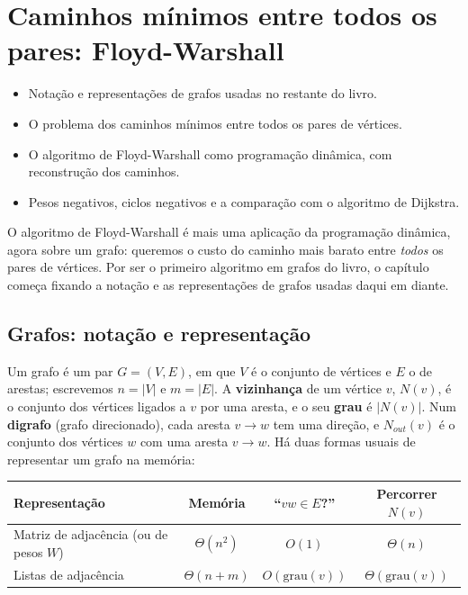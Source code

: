 \chapter{Caminhos mínimos entre todos os pares: Floyd-Warshall}\label{cap:fw}\label{sec:fw}
\begin{objetivos}
\begin{itemize}
  \item Notação e representações de grafos usadas no restante do livro.
  \item O problema dos caminhos mínimos entre todos os pares de vértices.
  \item O algoritmo de Floyd-Warshall como programação dinâmica, com reconstrução dos caminhos.
  \item Pesos negativos, ciclos negativos e a comparação com o algoritmo de Dijkstra.
\end{itemize}
\end{objetivos}

O algoritmo de Floyd-Warshall é mais uma aplicação da programação dinâmica, agora sobre um grafo: queremos o custo do caminho mais barato entre \emph{todos} os pares de vértices. Por ser o primeiro algoritmo em grafos do livro, o capítulo começa fixando a notação e as representações de grafos usadas daqui em diante.

\section{Grafos: notação e representação}\label{sec:buscas}
Um grafo é um par $G=(V,E)$, em que $V$ é o conjunto de vértices e $E$ o de arestas; escrevemos $n=|V|$ e $m=|E|$. A \textbf{vizinhança} de um vértice $v$, $N(v)$, é o conjunto dos vértices ligados a $v$ por uma aresta, e o seu \textbf{grau} é $|N(v)|$. Num \textbf{digrafo} (grafo direcionado), cada aresta $v\to w$ tem uma direção, e $N_{out}(v)$ é o conjunto dos vértices $w$ com uma aresta $v\to w$. Há duas formas usuais de representar um grafo na memória:
\begin{center}\small
\begin{tabular}{@{}lccc@{}}
\toprule
Representação & Memória & ``$vw\in E$?'' & Percorrer $N(v)$\\
\midrule
Matriz de adjacência (ou de pesos $W$) & $\Theta(n^2)$ & $O(1)$ & $\Theta(n)$\\
Listas de adjacência & $\Theta(n+m)$ & $O(\text{grau}(v))$ & $\Theta(\text{grau}(v))$\\
\bottomrule
\end{tabular}
\end{center}

